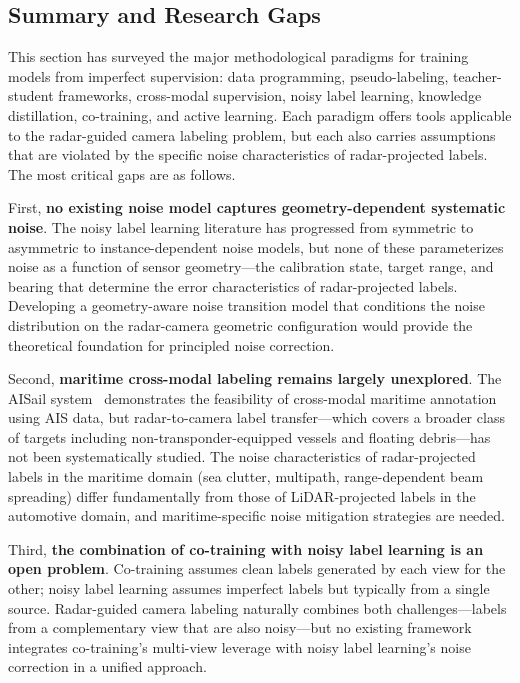 \subsection{Summary and Research Gaps}\label{subsec:ch4_summary}

This section has surveyed the major methodological paradigms for training models from imperfect supervision: data programming, pseudo-labeling, teacher-student frameworks, cross-modal supervision, noisy label learning, knowledge distillation, co-training, and active learning. Each paradigm offers tools applicable to the radar-guided camera labeling problem, but each also carries assumptions that are violated by the specific noise characteristics of radar-projected labels. The most critical gaps are as follows.

First, \textbf{no existing noise model captures geometry-dependent systematic noise}. The noisy label learning literature has progressed from symmetric to asymmetric to instance-dependent noise models, but none of these parameterizes noise as a function of sensor geometry---the calibration state, target range, and bearing that determine the error characteristics of radar-projected labels. Developing a geometry-aware noise transition model that conditions the noise distribution on the radar-camera geometric configuration would provide the theoretical foundation for principled noise correction.

Second, \textbf{maritime cross-modal labeling remains largely unexplored}. The AISail system~\cite{kim2024sailing} demonstrates the feasibility of cross-modal maritime annotation using AIS data, but radar-to-camera label transfer---which covers a broader class of targets including non-transponder-equipped vessels and floating debris---has not been systematically studied. The noise characteristics of radar-projected labels in the maritime domain (sea clutter, multipath, range-dependent beam spreading) differ fundamentally from those of LiDAR-projected labels in the automotive domain, and maritime-specific noise mitigation strategies are needed.

Third, \textbf{the combination of co-training with noisy label learning is an open problem}. Co-training assumes clean labels generated by each view for the other; noisy label learning assumes imperfect labels but typically from a single source. Radar-guided camera labeling naturally combines both challenges---labels from a complementary view that are also noisy---but no existing framework integrates co-training's multi-view leverage with noisy label learning's noise correction in a unified approach.

